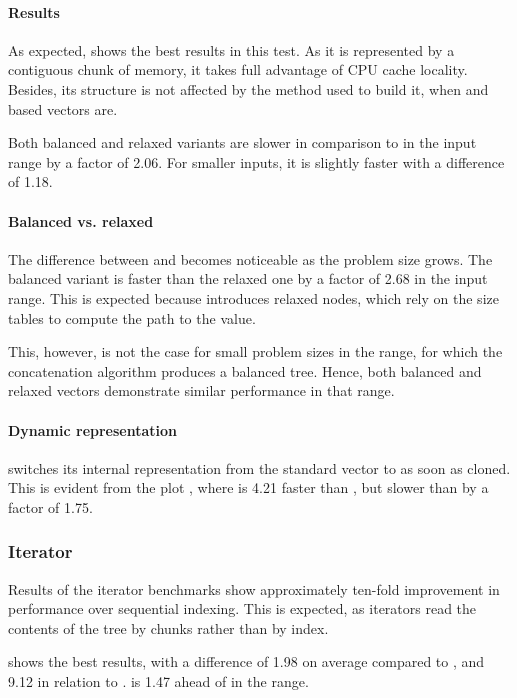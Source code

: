\paragraph{Results}
As expected, \stdvec{} shows the best results in this test. As it is represented by a contiguous chunk of memory, it takes full advantage of CPU cache locality. Besides, its structure is not affected by the method used to build it, when \rbtree{} and \rrbtree{} based vectors are.

Both balanced and relaxed \imrsvec{} variants are slower in comparison to \rrbvec{} in the \range{[100, \mega{1}]} input range by a factor of 2.06. For smaller inputs, \rrbvec{} it is slightly faster with a difference of 1.18.

\paragraph{Balanced vs. relaxed}
The difference between \rbvec{} and \rrbvec{} becomes noticeable as the problem size grows. The balanced variant is faster than the relaxed one by a factor of 2.68 in the \range{[100, \mega{1}]} input range. This is expected because \rrbvec{} introduces relaxed nodes, which rely on the size tables to compute the path to the value.

This, however, is not the case for small problem sizes in the \range{[0, 100]} range, for which the concatenation algorithm produces a balanced tree. Hence, both balanced and relaxed vectors demonstrate similar performance in that range.

\paragraph{Dynamic representation}
\pvec{} switches its internal representation from the standard vector to \rrbvec{} as soon as cloned. This is evident from the plot , where \pvec{} is 4.21 faster than \rbvec{}, but slower than \stdvec{} by a factor of 1.75.

\subsubsection*{Iterator}
Results of the iterator benchmarks show approximately ten-fold improvement in performance over sequential indexing. This is expected, as iterators read the contents of the tree by chunks rather than by index.

\stdvec{} shows the best results, with a difference of 1.98 on average compared to \pvec{}, and 9.12 in relation to \rrbvec{}. \imrsvec{} is 1.47 ahead of \rrbvec{} in the \range{[20, 100]} range.

